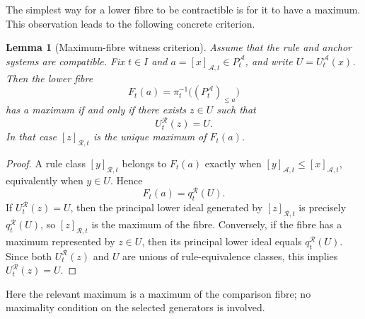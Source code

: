 \documentclass[a4paper,11pt]{article}
\newtheorem{lemma}[lemma]{Lemma}
\theoremstyle{definition}
\theoremstyle{remark}
\begin{document}
The simplest way for a lower fibre to be contractible is for it to have a maximum. This observation leads to the following concrete criterion.

\begin{lemma}[Maximum-fibre witness criterion]
\label{lem:maximum-fibre-witness}
Assume that the rule and anchor systems are compatible.  Fix $t\in I$ and $a=[x]_{\mathcal A,t}\in P_t^{\mathcal A}$, and write $U=U_t^{\mathcal A}(x)$. Then the lower fibre
$$
F_t(a)=\pi_t^{-1}\bigl((P_t^{\mathcal A})_{\leq a}\bigr)
$$
has a maximum if and only if there exists $z\in U$ such that
$$
U_t^{\mathcal R}(z)=U.
$$
In that case $[z]_{\mathcal R,t}$ is the unique maximum of $F_t(a)$.
\end{lemma}

\begin{proof}
A rule class $[y]_{\mathcal R,t}$ belongs to $F_t(a)$ exactly when $[y]_{\mathcal A,t}\leq[x]_{\mathcal A,t}$, equivalently when $y\in U$. Hence
$$
F_t(a)=q_t^{\mathcal R}(U).
$$
If $U_t^{\mathcal R}(z)=U$, then the principal lower ideal generated by $[z]_{\mathcal R,t}$ is precisely $q_t^{\mathcal R}(U)$, so $[z]_{\mathcal R,t}$ is the maximum of the fibre. Conversely, if the fibre has a maximum represented by $z\in U$, then its principal lower ideal equals $q_t^{\mathcal R}(U)$.  Since both $U_t^{\mathcal R}(z)$ and $U$ are unions of rule-equivalence classes, this implies $U_t^{\mathcal R}(z)=U$.
\end{proof}

Here the relevant maximum is a maximum of the comparison fibre; no maximality condition on the selected generators is involved.


\end{document}
